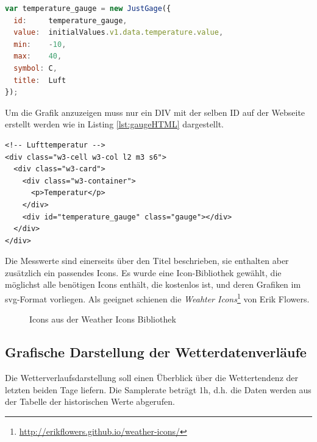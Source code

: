\begin{lstlisting}[label=lst:gaugeJS,caption=Konfiguration der Gauge, language=JavaScript,mathescape, style=htmlcssjs]
var temperature_gauge = new JustGage({
  id:     temperature_gauge,
  value:  initialValues.v1.data.temperature.value,
  min:    -10,
  max:    40,
  symbol: C,
  title:  Luft
});
\end{lstlisting}

Um die Grafik anzuzeigen muss nur ein DIV mit der selben ID auf der Webseite erstellt werden wie in Listing \ref{lst:gaugeHTML} dargestellt.

\begin{lstlisting}[label=lst:gaugeHTML,caption=Container für die SVG-Grafik (Gauge), language=HTML5, style=htmlcssjs]
<!-- Lufttemperatur -->
<div class="w3-cell w3-col l2 m3 s6">
  <div class="w3-card">
    <div class="w3-container">
      <p>Temperatur</p>
    </div>
    <div id="temperature_gauge" class="gauge"></div>
  </div>
</div>
\end{lstlisting}

Die Messwerte sind einerseits über den Titel beschrieben, sie enthalten aber zusätzlich ein passendes Icons. Es wurde eine Icon-Bibliothek gewählt, die möglichst alle benötigen Icons enthält, die kostenlos ist, und deren Grafiken im svg-Format vorliegen. Als geeignet schienen die \textit{Weahter Icons}\footnote{\url{http://erikflowers.github.io/weather-icons/}} von Erik Flowers.


\begin{figure}[h!]
	\centering
	\caption{Icons aus der Weather Icons Bibliothek}
	\label{img:icons}
\end{figure}





\subsection{Grafische Darstellung der Wetterdatenverläufe}
Die Wetterverlaufsdarstellung soll einen Überblick über die Wettertendenz der letzten beiden Tage liefern. Die Samplerate beträgt 1h, d.h. die Daten werden aus der Tabelle der historischen Werte abgerufen.

